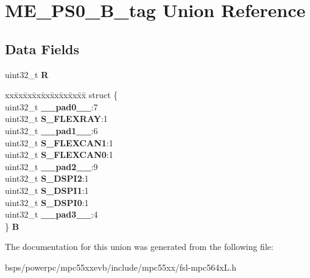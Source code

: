 \hypertarget{unionME__PS0__32B__tag}{}\section{M\+E\+\_\+\+P\+S0\+\_\+B\+\_\+tag Union Reference}
\label{unionME__PS0__32B__tag}
\subsection*{Data Fields}
\begin{DoxyCompactItemize}
\item 
\mbox{\label{unionME__PS0__32B__tag_a5f3536e1ce760848ed5cb50404e609e6}} 
uint32\+\_\+t {\bfseries R}
\item 
\mbox{\label{unionME__PS0__32B__tag_a4b3109d02fac6c9bc9f3b91cfa495d45}} 
\begin{tabbing}
xx\=xx\=xx\=xx\=xx\=xx\=xx\=xx\=xx\=\kill
struct \{\\
\>uint32\_t {\bfseries \_\_pad0\_\_}:7\\
\>uint32\_t {\bfseries S\_FLEXRAY}:1\\
\>uint32\_t {\bfseries \_\_pad1\_\_}:6\\
\>uint32\_t {\bfseries S\_FLEXCAN1}:1\\
\>uint32\_t {\bfseries S\_FLEXCAN0}:1\\
\>uint32\_t {\bfseries \_\_pad2\_\_}:9\\
\>uint32\_t {\bfseries S\_DSPI2}:1\\
\>uint32\_t {\bfseries S\_DSPI1}:1\\
\>uint32\_t {\bfseries S\_DSPI0}:1\\
\>uint32\_t {\bfseries \_\_pad3\_\_}:4\\
\} {\bfseries B}\\

\end{tabbing}\end{DoxyCompactItemize}


The documentation for this union was generated from the following file\+:\begin{DoxyCompactItemize}
\item 
bsps/powerpc/mpc55xxevb/include/mpc55xx/fsl-\/mpc564x\+L.\+h\end{DoxyCompactItemize}
